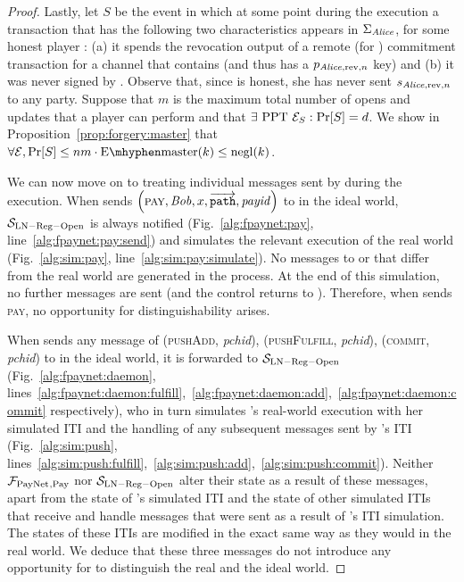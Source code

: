 \begin{proof}
  Lastly, let $S$ be the event in which at some point during the execution a
  transaction that has the following two characteristics appears in
  $\Sigma_{\mathit{Alice}}$, for some honest player \alice: (a) it spends the revocation
  output of a remote (for \alice{}) commitment transaction for a channel that
  contains \alice{} (and thus has a $p_{\mathit{Alice}, \mathrm{rev}, n}$ key) and (b)
  it was never signed by \alice. Observe that, since \alice{} is honest, she has
  never sent $s_{\mathit{Alice}, \mathrm{rev}, n}$ to any party. Suppose that $m$ is the
  maximum total number of opens and updates that a player can perform and that
  $\exists \text{ PPT } \mathcal{E}_S: \Pr[S] = d$. We show in
  Proposition~\ref{prop:forgery:master} that $\forall \environment, \Pr[S] \leq
  nm \cdot \mathrm{E \mhyphen master}(k) \leq \negl(k)$.

  We can now move on to treating individual messages sent by \environment{}
  during the execution. When \environment{} sends $\left(\textsc{pay}, \mathit{Bob}, x,
  \overrightarrow{\mathtt{path}}, \mathit{payid}\right)$ to \alice{} in the
  ideal world, $\mathcal{S}_{\mathrm{LN - Reg - Open}}$ is always notified
  (Fig.~\ref{alg:fpaynet:pay}, line~\ref{alg:fpaynet:pay:send}) and simulates
  the relevant execution of the real world (Fig.~\ref{alg:sim:pay},
  line~\ref{alg:sim:pay:simulate}). No messages to \ledger{} or \environment{}
  that differ from the real world are generated in the process. At the end of
  this simulation, no further messages are sent (and the control returns to
  \environment). Therefore, when \environment{} sends \textsc{pay}, no
  opportunity for distinguishability arises.

  When \environment{} sends any message of (\textsc{pushAdd}, \textit{pchid}),
  (\textsc{pushFulfill}, \textit{pchid}), (\textsc{commit}, \textit{pchid}) to
  \alice{} in the ideal world, it is forwarded to $\mathcal{S}_{\mathrm{LN - Reg
  - Open}}$ (Fig.~\ref{alg:fpaynet:daemon},
  lines~\ref{alg:fpaynet:daemon:fulfill},~\ref{alg:fpaynet:daemon:add},~\ref{alg:fpaynet:daemon:commit}
  respectively), who in turn simulates \alice's real-world execution with her
  simulated ITI and the handling of any subsequent messages sent by \alice's ITI
  (Fig.~\ref{alg:sim:push},
  lines~\ref{alg:sim:push:fulfill},~\ref{alg:sim:push:add},~\ref{alg:sim:push:commit}).
  Neither $\mathcal{F}_{\mathrm{PayNet}}{}_{\mathrm{, Pay}}$ nor $\mathcal{S}_{\mathrm{LN - Reg -
  Open}}$ alter their state as a result of these messages, apart from the state
  of \alice's simulated ITI and the state of other simulated ITIs that receive
  and handle messages that were sent as a result of \alice's ITI simulation. The
  states of these ITIs are modified in the exact same way as they would in the
  real world. We deduce that these three messages do not introduce any
  opportunity for \environment{} to distinguish the real and the ideal world.


\end{proof}
